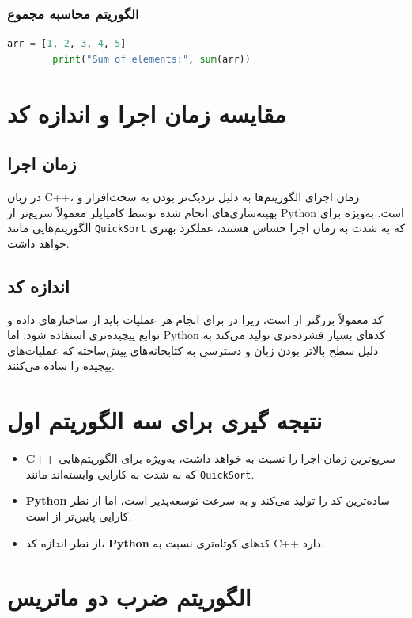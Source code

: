 \documentclass[12pt, a4paper]{report}
\begin{document}
\subsubsection{الگوریتم محاسبه مجموع}
\begin{LTR}
	\begin{lstlisting}[language=Python, breaklines=true]
		arr = [1, 2, 3, 4, 5]
		print("Sum of elements:", sum(arr))
	\end{lstlisting}
\end{LTR}

\section{مقایسه زمان اجرا و اندازه کد}

\subsection*{زمان اجرا}
در زبان C++، زمان اجرای الگوریتم‌ها به دلیل نزدیک‌تر بودن به سخت‌افزار و بهینه‌سازی‌های انجام شده توسط کامپایلر معمولاً سریع‌تر از Python است. به‌ویژه برای الگوریتم‌هایی مانند \texttt{QuickSort} که به شدت به زمان اجرا حساس هستند،  عملکرد بهتری خواهد داشت.

\subsection*{اندازه کد}
کد  معمولاً بزرگتر از  است، زیرا در  برای انجام هر عملیات باید از ساختارهای داده و توابع پیچیده‌تری استفاده شود. اما Python کدهای بسیار فشرده‌تری تولید می‌کند به دلیل سطح بالاتر بودن زبان و دسترسی به کتابخانه‌های پیش‌ساخته که عملیات‌های پیچیده را ساده می‌کنند.

\section{نتیجه گیری برای سه الگوریتم اول}
\begin{itemize}
	\item \textbf{C++} سریع‌ترین زمان اجرا را نسبت به  خواهد داشت، به‌ویژه برای الگوریتم‌هایی که به شدت به کارایی وابسته‌اند مانند \texttt{QuickSort}.
	\item \textbf{Python} ساده‌ترین کد را تولید می‌کند و به سرعت توسعه‌پذیر است، اما از نظر کارایی پایین‌تر از  است.
	\item از نظر اندازه کد، \textbf{Python} کدهای کوتاه‌تری نسبت به C++ دارد.
\end{itemize}
\section{الگوریتم ضرب دو ماتریس}
\end{document}
